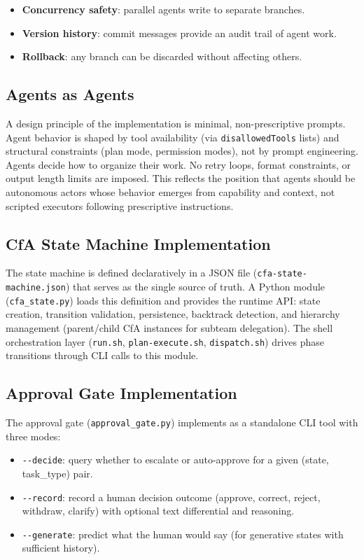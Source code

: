 \documentclass[11pt,a4paper]{article}
\begin{document}
\begin{itemize}
    \item \textbf{Concurrency safety}: parallel agents write to
    separate branches.
    \item \textbf{Version history}: commit messages provide an audit
    trail of agent work.
    \item \textbf{Rollback}: any branch can be discarded without
    affecting others.
\end{itemize}

\subsection{Agents as Agents}

A design principle of the implementation is minimal, non-prescriptive
prompts. Agent behavior is shaped by tool availability (via
\texttt{disallowedTools} lists) and structural constraints (plan mode,
permission modes), not by prompt engineering. Agents decide how to
organize their work. No retry loops, format constraints, or output
length limits are imposed. This reflects the position that agents
should be autonomous actors whose behavior emerges from capability
and context, not scripted executors following prescriptive instructions.

\subsection{CfA State Machine Implementation}

The state machine is defined declaratively in a JSON file
(\texttt{cfa-state-machine.json}) that serves as the single source
of truth. A Python module (\texttt{cfa\_state.py}) loads this
definition and provides the runtime API: state creation, transition
validation, persistence, backtrack detection, and hierarchy management
(parent/child CfA instances for subteam delegation). The shell
orchestration layer (\texttt{run.sh}, \texttt{plan-execute.sh},
\texttt{dispatch.sh}) drives phase transitions through CLI calls to
this module.

\subsection{Approval Gate Implementation}

The approval gate (\texttt{approval\_gate.py}) implements
 as a standalone CLI tool with three modes:

\begin{itemize}
    \item \texttt{-{}-decide}: query whether to escalate or auto-approve
    for a given (state, task\_type) pair.
    \item \texttt{-{}-record}: record a human decision outcome
    (approve, correct, reject, withdraw, clarify) with optional
    text differential and reasoning.
    \item \texttt{-{}-generate}: predict what the human would say
    (for generative states with sufficient history).
\end{itemize}
\end{document}
